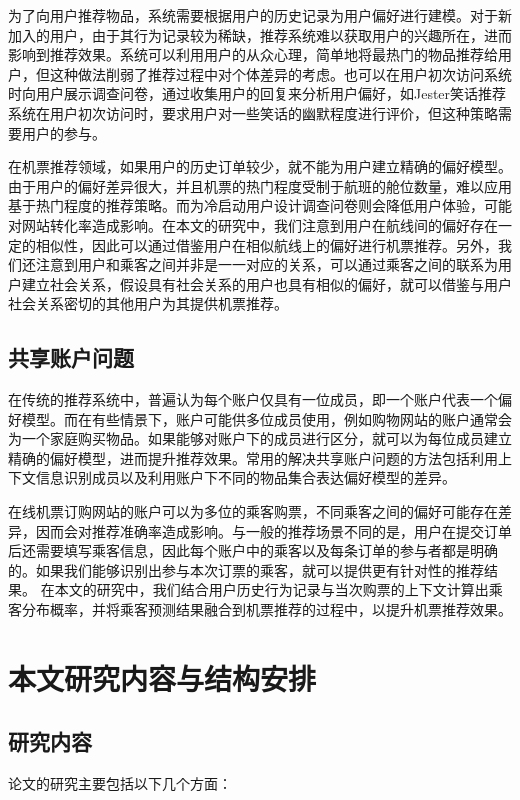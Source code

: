 为了向用户推荐物品，系统需要根据用户的历史记录为用户偏好进行建模。对于新加入的用户，由于其行为记录较为稀缺，推荐系统难以获取用户的兴趣所在，进而影响到推荐效果。系统可以利用用户的从众心理，简单地将最热门\cite{sun2012survey}的物品推荐给用户，但这种做法削弱了推荐过程中对个体差异的考虑。也可以在用户初次访问系统时向用户展示调查问卷，通过收集用户的回复来分析用户偏好，如Jester\cite{goldberg2001eigentaste}笑话推荐系统在用户初次访问时，要求用户对一些笑话的幽默程度进行评价，但这种策略需要用户的参与。

在机票推荐领域，如果用户的历史订单较少，就不能为用户建立精确的偏好模型。由于用户的偏好差异很大，并且机票的热门程度受制于航班的舱位数量，难以应用基于热门程度的推荐策略。而为冷启动用户设计调查问卷则会降低用户体验，可能对网站转化率造成影响。在本文的研究中，我们注意到用户在航线间的偏好存在一定的相似性，因此可以通过借鉴用户在相似航线上的偏好进行机票推荐。另外，我们还注意到用户和乘客之间并非是一一对应的关系，可以通过乘客之间的联系为用户建立社会关系\cite{sedhain2014social}，假设具有社会关系的用户也具有相似的偏好，就可以借鉴与用户社会关系密切的其他用户为其提供机票推荐。

\subsection{共享账户问题}

在传统的推荐系统中，普遍认为每个账户仅具有一位成员，即一个账户代表一个偏好模型\cite{kabutoya2010modeling}。而在有些情景下，账户可能供多位成员使用，例如购物网站的账户通常会为一个家庭购买物品。如果能够对账户下的成员进行区分，就可以为每位成员建立精确的偏好模型，进而提升推荐效果。常用的解决共享账户问题的方法包括利用上下文信息识别成员\cite{adomavicius2011context}以及利用账户下不同的物品集合\cite{verstrepen2015top}表达偏好模型的差异。

在线机票订购网站的账户可以为多位的乘客购票，不同乘客之间的偏好可能存在差异，因而会对推荐准确率造成影响。与一般的推荐场景不同的是，用户在提交订单后还需要填写乘客信息，因此每个账户中的乘客以及每条订单的参与者都是明确的。如果我们能够识别出参与本次订票的乘客，就可以提供更有针对性的推荐结果。
在本文的研究中，我们结合用户历史行为记录与当次购票的上下文计算出乘客分布概率，并将乘客预测结果融合到机票推荐的过程中，以提升机票推荐效果。


\section{本文研究内容与结构安排}
\subsection{研究内容}
论文的研究主要包括以下几个方面：


